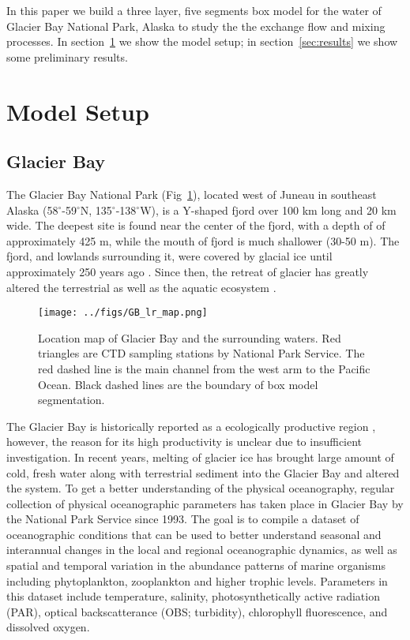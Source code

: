 \documentclass{article}
\begin{document}
In this paper we build a three layer, five segments box model for the water of Glacier Bay National Park, Alaska to study the the exchange flow and mixing processes. In section~\ref{sec:method} we show the model setup; in section~\ref{sec:results} we show some preliminary results.\\

\section{Model Setup}
\label{sec:method}
\subsection{Glacier Bay}
\label{sec:glacierbay}
The Glacier Bay National Park (Fig~\ref{fig:map}), located west of Juneau in southeast Alaska (58$^{\circ}$-59$^{\circ}$N, 135$^{\circ}$-138$^{\circ}$W), is a Y-shaped fjord over 100 km long and 20 km wide. The deepest site is found near the center of the fjord, with a depth of of approximately 425 m, while the mouth of fjord is much shallower (30-50 m). The fjord, and lowlands surrounding it, were covered by glacial ice until approximately 250 years ago \citep{cooper1923recent}. Since then, the retreat of glacier has greatly altered the terrestrial \citep{chapin1994mechanisms} as well as the aquatic ecosystem \citep{milner2000colonization}.\\

\begin{figure}
\centerline{\texttt{[image: ../figs/GB\_lr\_map.png]}}
\caption{Location map of Glacier Bay and the surrounding waters. Red triangles are CTD sampling stations by National Park Service. The red dashed line is the main channel from the west arm to the Pacific Ocean. Black dashed lines are the boundary of box model segmentation.}
\label{fig:map}
\end{figure}

The Glacier Bay is historically reported as a ecologically productive region \citep{cooper1923recent, cooper1923recentb}, however, the reason for its high productivity is unclear due to insufficient investigation. In recent years, melting of glacier ice has brought large amount of cold, fresh water along with terrestrial sediment into the Glacier Bay and altered the system. To get a better understanding of the physical oceanography, regular collection of physical oceanographic parameters has taken place in Glacier Bay by the National Park Service since 1993. The goal is to compile a dataset of oceanographic conditions that can be used to better understand seasonal and interannual changes in the local and regional oceanographic dynamics, as well as spatial and temporal variation in the abundance patterns of marine organisms including phytoplankton, zooplankton and higher trophic levels. Parameters in this dataset include temperature, salinity, photosynthetically active radiation (PAR), optical backscatterance (OBS; turbidity), chlorophyll fluorescence, and dissolved oxygen.\\
\end{document}
